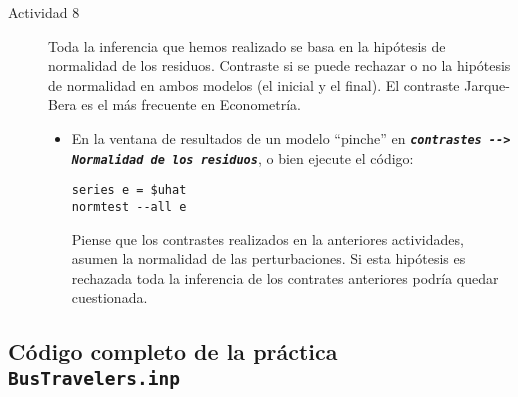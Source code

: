 \documentclass[11pt]{article}
\begin{document}
\begin{description}
\item[{Actividad 8}] Toda la inferencia que hemos realizado se basa en la
hipótesis de normalidad de los residuos. Contraste si se puede
rechazar o no la hipótesis de normalidad en ambos modelos (el
inicial y el final). El contraste Jarque-Bera es el más frecuente en
Econometría.
\begin{itemize}
\item En la ventana de resultados de un modelo ``pinche'' en
\textbf{\emph{\texttt{contrastes -{}-> Normalidad de los residuos}}}, o bien ejecute el
código:
\begin{verbatim}
series e = $uhat
normtest --all e
\end{verbatim}
Piense que los contrastes realizados en la anteriores actividades,
asumen la normalidad de las perturbaciones. Si esta hipótesis es
rechazada toda la inferencia de los contrates anteriores podría
quedar cuestionada.
\end{itemize}
\end{description}

\subsection{Código completo de la práctica \texttt{BusTravelers.inp}}
\label{sec:org29c0ce6}

\clearpage
\end{document}
